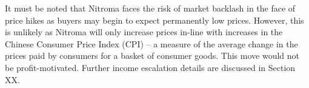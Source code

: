 It must be noted that Nitroma faces the risk of market backlash in the face of price hikes as buyers may begin to expect permanently low prices. However, this is unlikely as Nitroma will only increase prices in-line with increases in the Chinese Consumer Price Index (CPI) – a measure of the average change in the prices paid by consumers for a basket of consumer goods. This move would not be profit-motivated. Further income escalation details are discussed in Section XX.